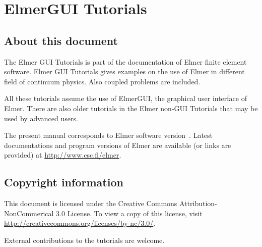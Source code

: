 \chapter*{ElmerGUI Tutorials}

\section*{About this document}

The Elmer GUI Tutorials is part of the documentation of 
Elmer finite element software.
Elmer GUI Tutorials gives examples on the use of Elmer in different field
of continuum physics. Also coupled problems are included. 

All these tutorials assume the use of ElmerGUI, the graphical 
user interface of Elmer. There are also older tutorials in the Elmer non-GUI Tutorials that 
may be used by advanced users.

The present manual
corresponds to Elmer software version~\elmerversion{}.
Latest documentations and program versions of Elmer are available (or links are provided) at 
\url{http://www.csc.fi/elmer}. 

\section*{Copyright information}

This document is licensed under the Creative Commons Attribution-NonCommerical 3.0 License. 
To view a copy of this license, visit \url{http://creativecommons.org/licenses/by-nc/3.0/}.

External contributions to the tutorials are welcome. 


